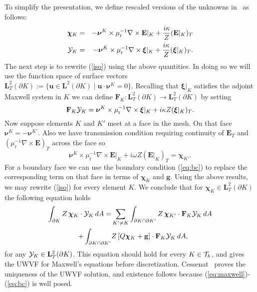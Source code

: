 \documentclass[a4paper,12pt]{article}
\newcommand{\bfE}{\mathbf{E}}
\newcommand{\bfF}{\mathbf{F}}
\newcommand{\bfL}{\mathbf{L}}
\newcommand{\bfnu}{\boldsymbol{\nu}}
\newcommand{\bfchi}{\boldsymbol{\chi}}
\newcommand{\bfg}{\mathbf{g}}
\newcommand{\bfu}{\mathbf{u}}
\newcommand{\mur}{\mu_{\mathrm{r}}}
\newcommand{\bfxi}{\boldsymbol{\xi}}
\begin{document}
To simplify the presentation,  we define rescaled versions of the unknowns in~\cite{cessenat_phd} as follows:
\begin{eqnarray}
\bfchi_K&=&-\bfnu^K\times\mur^{-1}\nabla\times\bfE|_{K}+\frac{i\kappa{}}{Z} (\bfE|_K)_T \label{eq:chi}\\
{\cal Y}_K&=&-\bfnu^K\times\mur^{-1}\nabla\times\bfxi|_{K}+\frac{i\kappa{}}{Z} (\bfxi|_K)_T.
\end{eqnarray}
The next step is to rewrite  (\ref{iso}) using the above quantities.  In doing so we will use the function space
of surface vectors $\bfL_T^2(\partial K):=\{\bfu\in\bfL^2(\partial K)\;|\;\bfu\cdot\bfnu^K=0\}$.
Recalling that $\bfxi|_K$ satisfies the adjoint Maxwell system in $K$ we can define $\bfF_K: \bfL_T^2(\partial K)\to  \bfL_T^2(\partial K)$ by setting
\[
\bfF_K{\cal Y}_K=\bfnu^K\times\mur^{-1}\nabla\times\bfxi|_{K}+i\kappa{}Z (\bfxi|_K)_T.
\]
Now suppose elements $K$ and $K'$ meet at a face in the mesh.  On that face $\bfnu^K=-\bfnu^{K'}$.  Also we have transmission condition requiring continuity of $\bfE_T$ and $(\mur^{-1}\nabla\times\bfE)_T$ across the face so
\begin{equation}
    \bfnu^K\times\mur^{-1}\nabla\times\bfE|_K+i\omega{}Z (\bfE|_K)_T
    =\bfchi_{K'}.\label{trans}
\end{equation}
For a boundary face we can use the boundary condition (\ref{eq:bc}) 
to replace the corresponding term on that face in terms of $\bfchi_K$ and $\bfg$.
Using the above results, we may rewrite (\ref{iso}) for every element $K$.  We conclude that for $\bfchi_K\in \bfL_T^2(\partial K)$  the following equation
holds 
\begin{align}
\int_{\partial K}Z\,\bfchi_K\cdot{\cal Y}_K\,dA=&\sum_{K'\not= K}\int_{\partial K\cap \partial K'}Z\,\bfchi_{K'}\cdot \bfF_K{\cal Y}_K\,dA\nonumber\\
+\int_{\partial K\cap \partial K'}&Z\left[Q\bfchi_K+\bfg\right]\cdot \bfF_K{\cal Y}_K\,dA,\label{eqUWVFeq}
\end{align}
for any ${\cal Y}_K\in \bfL^2_T(\partial K)$.
This equation should hold for every $K\in {\cal T}_h$, and gives the UWVF for Maxwell's equations before discretization.  Cessenat~\cite{cessenat_phd} proves the uniqueness of the UWVF solution, and existence follows because (\ref{eq:maxwell})-(\ref{eq:bc}) is well posed.
\end{document}
